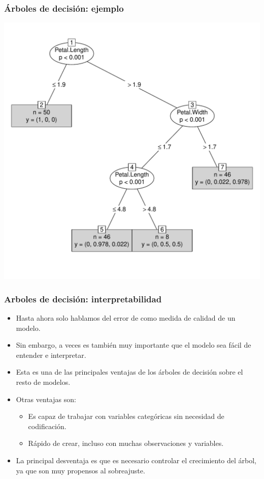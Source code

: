 \documentclass{beamer}
\begin{document}
\begin{frame}
\frametitle{Árboles de decisión: ejemplo}
\centering
\includegraphics[height=0.9\textheight]{arbol.pdf}
\end{frame}

\begin{frame}
\frametitle{Arboles de decisión: interpretabilidad}

\begin{itemize}
\item Hasta ahora solo hablamos del error de como medida de calidad de un modelo.
\item Sin embargo, a veces es también muy importante que el modelo sea fácil de entender e interpretar.
\item Esta es una de las principales ventajas de los árboles de decisión sobre el resto de modelos.
\item Otras ventajas son:
\begin{itemize}
\item Es capaz de trabajar con variables categóricas sin necesidad de codificación.
\item Rápido de crear, incluso con muchas observaciones y variables.
\end{itemize}
\item La principal desventaja es que es necesario controlar el crecimiento del árbol, ya que son muy propensos al sobreajuste.
\end{itemize}
\end{frame}
\end{document}
